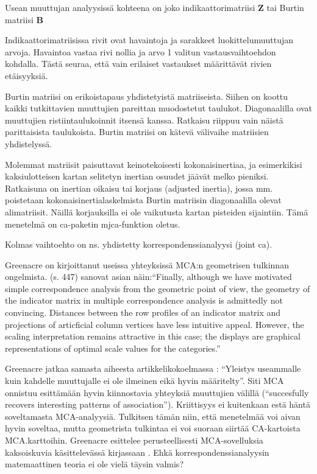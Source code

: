 \documentclass[
  finnish,
]{book}
\begin{document}
Usean muuttujan analyysissä kohteena on joko indikaattorimatriisi \(\boldsymbol{Z}\) tai
Burtin matriisi \(\boldsymbol{B}\)

Indikaattorimatriisissa rivit ovat havaintoja ja sarakkeet luokittelumuuttujan arvoja.
Havaintoa vastaa rivi nollia ja arvo 1 valitun vastausvaihtoehdon kohdalla. Tästä seuraa,
että vain erilaiset vastaukset määrittävät rivien etäisyyksiä.

Burtin matriisi on erikoistapaus yhdistetyistä matriiseista. Siihen on koottu kaikki tutkittavien
muuttujien pareittan muodostetut taulukot. Diagonaalilla ovat muuttujien ristiintaulukoinnit
itsensä kanssa. Ratkaisu riippuu vain näistä parittaisista taulukoista. Burtin matriisi on
kätevä välivaihe matriisien yhdistelyssä.

Molemmat matriisit paisuttavat keinotekoisesti kokonaisinertiaa, ja esimerkikisi kaksiulotteisen kartan
selitetyn inertian osuudet jäävät melko pieniksi. Ratkaisuna on inertian oikaisu tai korjaus
(adjusted inertia), jossa mm. poistetaan kokonaisinertialaskelmista Burtin matriisin
diagonaalilla olevat alimatriisit. Näillä korjauksilla ei ole vaikutusta kartan pisteiden
sijaintiin. Tämä menetelmä on ca-paketin mjca-funktion oletus.

Kolmas vaihtoehto on ns. yhdistetty korrespondenssianalyysi (joint ca).

Greenacre on kirjoittanut useissa yhteyksissä MCA:n geometrisen tulkinnan ongelmista.
\citet{RefWorks:doc:5a857a44e4b0ed2d44664d84} (s. 447) sanovat asian näin:``Finally, although
we have motivated simple correspondence analysis from the geometric point of view,
the geometry of the indicator matrix in multiple correspondence analysis is
admittedly not convincing. Distances between the row profiles of an indicator
matrix and projections of articficial column vertices have less intuitive appeal.
However, the scaling interpretation remains attractive in this case; the displays
are graphical representations of optimal scale values for the categories.''

Greenacre jatkaa samasta aiheesta artikkelikokoelmassa
\citep[ , s. 41, s. 61]{RefWorks:doc:5ab76b43e4b003f4468d1f07}: ``Yleistys useammalle
kuin kahdelle muuttujalle ei ole ilmeinen eikä hyvin määritelty''. Siti MCA
onnistuu esittämään hyvin kiinnostavia yhteyksiä muuttujien välillä (``succesfully
recovers interesting patterns of association''). Kriittisyys ei kuitenkaan
estä häntä soveltamasta MCA-analyysiä. Tulkitsen tämän niin, että menetelmää voi
aivan hyvin soveltaa, mutta geometrista tulkintaa ei voi suoraan siirtää CA-kartoista
MCA.karttoihin. Greenacre esittelee perusteellisesti MCA-sovelluksia kaksoiskuvia
käsittelevässä kirjassaan \citep{RefWorks:doc:5a857a43e4b0ed2d44664d7c}. Ehkä
korrespondenssianalyysin matemaattinen teoria ei ole vielä täysin valmis?
\end{document}
